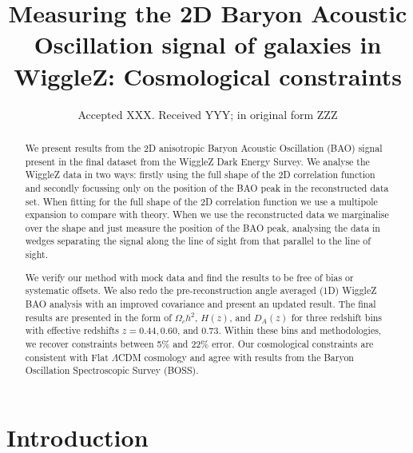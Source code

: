 \documentclass[a4paper,fleqn,usenatbib]{mnras}
\title[WiggleZ 2D BAO]{Measuring the 2D Baryon Acoustic Oscillation signal of galaxies in WiggleZ: Cosmological constraints} %
\author[S. R. Hinton et al.]{Samuel R. Hinton,$^{1,2}$\thanks{E-mail: \href{samuelreay@gmail.com}}
Eyal Kazin,$^{3,2}$
Tamara M. Davis,$^{1,2}$
Chris Blake,$^{3}$\newauthor
Sarah Brough,$^{5}$
Matthew Colless,$^{4}$
Warrick J. Couch,$^{5}$ \newauthor
Michael J. Drinkwater,$^{1}$
Karl Glazebrook,$^{3}$
Russell J. Jurek,$^{6}$
David Parkinson,$^{1,2}$ \newauthor
Kevin A. Pimbblet,$^{7,8,9}$
Gregory B. Poole,$^{10}$
Michael Pracy$^{11}$ and
David Woods$^{12}$
\\
$^{1}$School of Mathematics and Physics, The University of Queensland, Brisbane, QLD 4072, Australia\\
$^{2}$ARC Centre of Excellence for All-sky Astrophysics (CAASTRO)\\
$^{3}$Centre for Astrophysics \& Supercomputing, Swinburne University of Technology, P.O. Box 218, Hawthorn, VIC 3122, Australia\\
$^{4}$Research School of Astronomy and Astrophysics, The Australian National University, Canberra, ACT 2611, Australia\\
$^{5}$Australian Astronomical Observatory, PO Box 915, North Ryde, NSW 1670, Australia\\
$^{6}$Australia Telescope National Facility, CSIRO, Epping, NSW 1710, Australia\\
$^{7}$E.A.Milne Centre for Astrophysics, University of Hull, Cottingham Road, Hull HU6 7RX, UK\\
$^{8}$School of Physics, Monash University, Clayton, Victoria 3800, Australia;\\ 
$^{9}$Monash Centre for Astrophysics (MoCA), Monash University, Clayton, Victoria 3800, Australia\\
$^{10}$School of Physics, University of Melbourne, Parksville, VIC 3010\\
$^{11}$Sydney Institute for Astronomy, School of Physics, University of Sydney, NSW 2006, Australia\\
$^{12}$Department of Physics and Astronomy, University of British Columbia, 6224 Agricultural Road, Vancouver, BC V6T 1Z1, Canada
}
\date{Accepted XXX. Received YYY; in original form ZZZ}
\begin{document}
\label{firstpage}
\pagerange{\pageref{firstpage}--\pageref{lastpage}}
\maketitle



\begin{abstract}
We present results from the 2D anisotropic Baryon Acoustic Oscillation (BAO) signal present in the final dataset from the WiggleZ Dark Energy Survey.  We analyse the WiggleZ data in two ways: firstly using the full shape of the 2D correlation function and secondly focussing only on the position of the BAO peak in the reconstructed data set. When fitting for the full shape of the 2D correlation function we use a multipole expansion to compare with theory.  When we use the reconstructed data we marginalise over the shape and just measure the position of the BAO peak, analysing the data in wedges separating the signal along the line of sight from that parallel to the line of sight. 

We verify our method with mock data and find the results to be free of bias or systematic offsets.  We also redo the pre-reconstruction angle averaged (1D) WiggleZ BAO analysis with an improved covariance and present an updated result.   The final results are presented in the form of $\Omega_c h^2$, $H(z)$, and $D_A(z)$ for three redshift bins with effective redshifts $z = 0.44, 0.60$, and $0.73$. Within these bins and methodologies, we recover constraints between 5\% and 22\% error. Our cosmological constraints are consistent with Flat $\Lambda$CDM cosmology and agree with results from the Baryon Oscillation Spectroscopic Survey (BOSS).
\end{abstract}


\clearpage
\section{Introduction}
\end{document}
